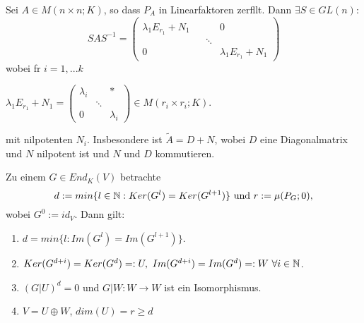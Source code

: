 \documentclass[9pt, a4paper, twocolumn, landscape]{article}
\newcommand{\comment}[1]{}
\begin{document}
\begin{corollary}
Sei $A \in M(n \times n; K)$, so dass $P_A$ in Linearfaktoren zerf\aee llt. Dann $\exists S \in GL(n)$: 
$$
S A S^{-1}=\left(\begin{array}{cccc}{} & {} & {} & {} 
\\ {\lambda_{1} E_{r_{1}}+N_{1}} & {} & {} & {0} 
\\ {} & {} & {\ddots} & {} 
\\ {0} & {} & {} & {\lambda_{1} E_{r_{1}}+N_{1}} 
\end{array}\right)
$$
wobei f\uee r $i = 1, ... k$
\\ \centerline{$
\lambda_{1} E_{r_{1}}+N_{1} = 
\left(\begin{array}{ccc}
{\lambda_{i}} & {} & {*} 
\\ {} & {\ddots} & {} 
\\ {0} & {} & {\lambda_{i}}\end{array}\right) \in M(r_i \times r_i; K)$.}
mit nilpotenten $N_i$. Insbesondere ist $\tilde{A} = D + N$, wobei $D$ eine Diagonalmatrix und $N$ nilpotent ist und $N$ und $D$ kommutieren.
\end{corollary}

\begin{lemma}
 Zu einem $G \in End_K(V) $ betrachte
$$d := min \{ l \in \mathbb{N} : Ker (G^l) =Ker(G^{l + 1}) \} \text{ und } r := \mu (P_G ; 0),$$
wobei $G^0 := id_V$. Dann gilt:
\begin{enumerate}
\item $d =min \{l : Im(G^l) = Im(G^{l + 1}) \}.$
\item $Ker (G^{d + i}) = Ker (G^d) =: U, \ Im (G^{d + i}) = Im (G^d) =: W \ \forall i \in \mathbb{N}$.
\item $(G|U)^d = 0$ und $G|W: W \rightarrow W$ ist ein Isomorphismus.
\item $V = U \oplus W$, $dim(U) = r \geq d$ %
\comment{ \\ Insbesondere gibt es eine Basis $\mathcal{B}$ von $V$, so dass
\\ \centerline{$M_\mathcal{B}(G) =
\left(\begin{array}{ll}{N} & {0} 
\\ {0} & {C}\end{array}\right) 
$
mit  $N^d = 0$ und $C \in GL (n-r; K)$.} }
\end{enumerate}
\end{lemma}
\end{document}

